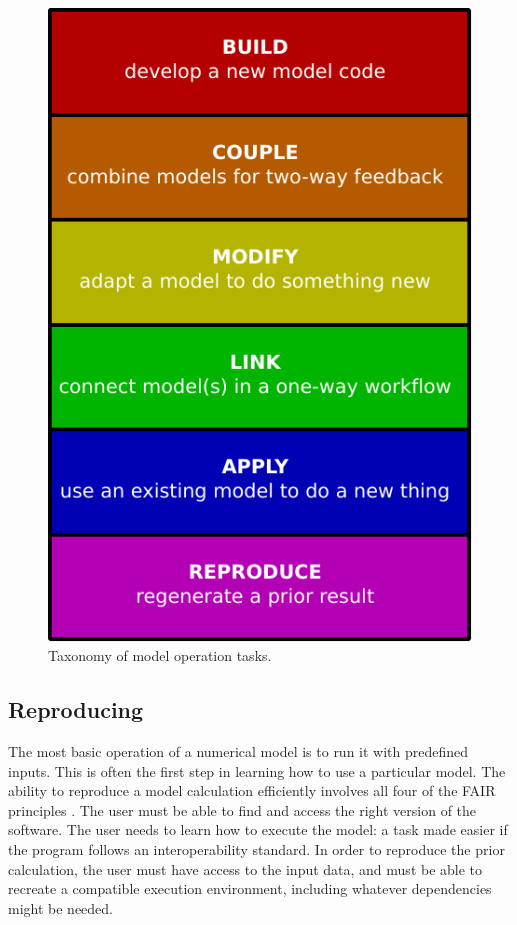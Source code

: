 \documentclass[journal abbreviation, manuscript]{copernicus}
\begin{document}
\begin{figure}[h!]
\centering
\includegraphics[scale=0.8]{Figures/fig02.pdf}
\caption{Taxonomy of model operation tasks.}
\label{fig:taxonomy}
\end{figure}


\subsection{Reproducing}

The most basic operation of a numerical model is to run it with predefined inputs. This is often the first step in learning how to use a particular model. The ability to reproduce a model calculation efficiently involves all four of the FAIR principles \citep{wilkinson2016fair}. The user must be able to find and access the right version of the software. The user needs to learn how to execute the model: a task made easier if the program follows an interoperability standard. In order to reproduce the prior calculation, the user must have access to the input data, and must be able to recreate a compatible execution environment, including whatever dependencies might be needed.
\end{document}
